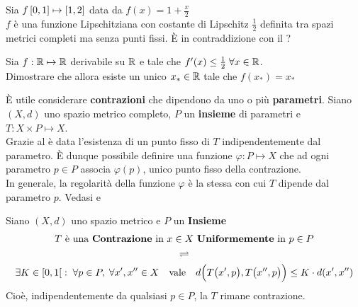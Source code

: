 \begin{exercise}
	Sia $f \left[0,1\right] \mapsto \left[1,2\right]$ data da $f(x) = 1 + \frac{x}{2}$\\
	$f$ è una funzione Lipschitziana con costante di Lipschitz $\frac{1}{2}$ definita tra spazi metrici completi ma senza punti fissi. È in contraddizione con il ?
\end{exercise}
\begin{exercise}
	Sia $f:\mathbb{R} \mapsto \mathbb{R}$ derivabile su $\mathbb{R}$ e tale che $f'(x) \leq \frac{1}{2} \; \forall x \in \mathbb{R}$.\\
	Dimostrare che allora esiste un unico $x_* \in \mathbb{R}$ tale che $f(x_*) = x_*$
\end{exercise}

\begin{observation}
	\label{obs:contr_con_para}
	È utile considerare \textbf{contrazioni} che dipendono da uno o più \textbf{parametri}. Siano $(X,d)$ uno spazio metrico completo, $P$ un \textbf{insieme} di parametri e $T:X \times P \mapsto X$.\\
	Grazie al  è data l'esistenza di un punto fisso di $T$ indipendentemente dal parametro. È dunque possibile definire una funzione $\varphi: P \mapsto X$ che ad ogni parametro $p \in P$ associa $\varphi(p)$, unico punto fisso della contrazione.\\
	In generale, la regolarità della funzione $\varphi$ è la stessa con cui $T$ dipende dal parametro $p$. Vedasi  e 
\end{observation}

\begin{definition}
	\label{def:contrazione_parametro}
	Siano $(X,d)$ uno spazio metrico e $P$ un \textbf{Insieme}
	\begin{equation*}
		\begin{gathered}
			T \text{ è una \textbf{Contrazione} in } x \in X \text{ \textbf{Uniformemente} in } p \in P\\
			\rightleftharpoons\\
			\exists K \in \left[0,1\right[: \; \forall p \in P,\; \forall x', x'' \in X \quad \text{vale} \quad d \Bigl( T\bigl( x', p \bigr), T\bigl( x'', p \bigr) \Bigr) \leq K \cdot d(x', x'')
		\end{gathered}
	\end{equation*}
	Cioè, indipendentemente da qualsiasi $p \in P$, la $T$ rimane contrazione.
\end{definition}

